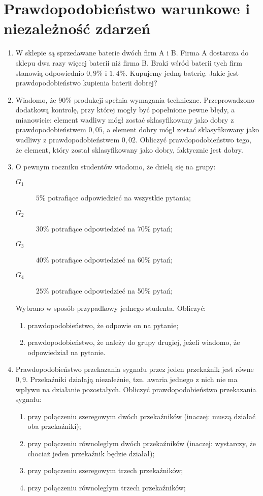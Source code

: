 \documentclass{mwart}
\newcommand{\ans}[1]{}
\begin{document}
\section{Prawdopodobieństwo warunkowe i niezależność zdarzeń}
\begin{enumerate}
\item W sklepie są sprzedawane baterie dwóch firm A i B. Firma A dostarcza do sklepu dwa razy więcej baterii niż firma B. Braki wśród baterii tych firm stanowią odpowiednio $0{,}9\%$ i $1{,}4\%$. Kupujemy jedną baterię. Jakie jest prawdopodobieństwo kupienia baterii dobrej?
\item Wiadomo, że 90\% produkcji spełnia wymagania techniczne. Przeprowadzono dodatkową kontrolę, przy której mogły być popełnione pewne błędy, a mianowicie: element wadliwy mógł zostać sklasyfikowany jako dobry z prawdopodobieństwem $0{,}05$, a element dobry mógł zostać sklasyfikowany jako wadliwy z prawdopodobieństwem $0{,}02$. Obliczyć prawdopodobieństwo tego, że element, który został sklasyfikowany jako dobry, faktycznie jest dobry. \ans{$P(S|K)=\frac{P(K|S)P(S)}{P(K)}=\frac{(1-P(K'|S))P(S)}{(1-P(K'|S))P(S)+P(K|S')P(S')}=\frac{(1-0{,}02)0{,}9}{(1-0{,}02)0{,}9+0{,}05\cdot0{,}1}\approx0{,}994$}
\item O pewnym roczniku studentów wiadomo, że dzielą się na grupy:
\begin{description}
\item[$G_1$] $5\%$ potrafiące odpowiedzieć na wszystkie pytania;
\item[$G_2$] $30\%$ potrafiące odpowiedzieć na 70\% pytań;
\item[$G_3$] $40\%$ potrafiące odpowiedzieć na 60\% pytań;
\item[$G_4$] $25\%$ potrafiące odpowiedzieć na 50\% pytań;
\end{description}
Wybrano w sposób przypadkowy jednego studenta. Obliczyć:
\begin{enumerate}
\item prawdopodobieństwo, że odpowie on na pytanie; \ans{$P(O)=\sum P(O|G_i)P(G_i)=0{,}625$}
\item prawdopodobieństwo, że należy do grupy drugiej, jeżeli wiadomo, że odpowiedział na pytanie. \ans{$P(G_2|O)=\frac{P(O|G_2)|P(G_2)}{P(O)}=0{,}336$}
\end{enumerate}
\item Prawdopodobieństwo przekazania sygnału przez jeden przekaźnik jest równe $0{,}9$. Przekaźniki działają niezależnie, tzn. awaria jednego z nich nie ma wpływu na działanie pozostałych.
Obliczyć prawdopodobieństwo przekazania sygnału:
\begin{enumerate}
\item przy połączeniu szeregowym dwóch przekaźników (inaczej: muszą działać oba przekaźniki);
\item przy połączeniu równoległym dwóch przekaźników (inaczej: wystarczy, że chociaż jeden przekaźnik będzie działał);
\item przy połączeniu szeregowym trzech przekaźników;
\item przy połączeniu równoległym trzech przekaźników;
\end{enumerate}
\end{enumerate}
\clearpage
\end{document}
